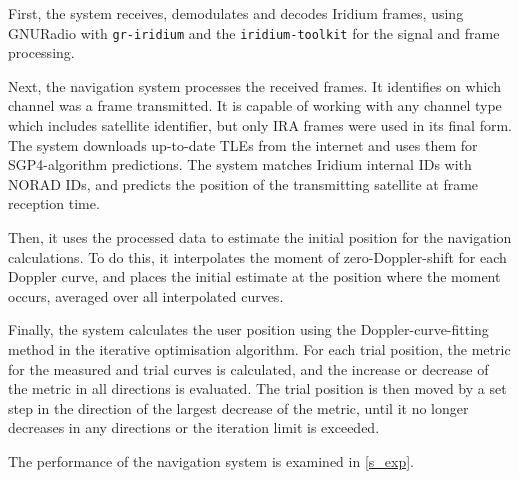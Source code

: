 First, the system receives, demodulates and decodes Iridium frames, using GNURadio with \texttt{gr-iridium} and the \texttt{iridium-toolkit} for the signal and frame processing.

Next, the navigation system processes the received frames. It identifies on which channel was a frame transmitted. It is capable of working with any channel type which includes satellite identifier, but only IRA frames were used in its final form. The system downloads up-to-date TLEs from the internet and uses them for SGP4-algorithm predictions. The system matches Iridium internal IDs with NORAD IDs, and predicts the position of the transmitting satellite at frame reception time.

Then, it uses the processed data to estimate the initial position for the navigation calculations. To do this, it interpolates the moment of zero-Doppler-shift for each Doppler curve, and places the initial estimate at the position where the moment occurs, averaged over all interpolated curves.

Finally, the system calculates the user position using the Doppler-curve-fitting method in the iterative optimisation algorithm. For each trial position, the metric for the measured and trial curves is calculated, and the increase or decrease of the metric in all directions is evaluated. The trial position is then moved by a set step in the direction of the largest  decrease of the metric, until it no longer decreases in any directions or the iteration limit is exceeded.

The performance of the navigation system is examined in \autoref{s_exp}.
